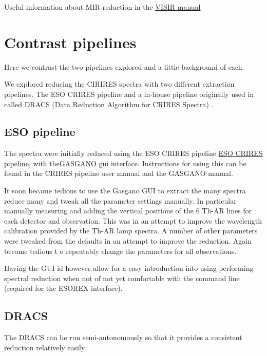 Useful information about MIR reduction in the 
\href{https://www.eso.org/sci/facilities/paranal/instruments/visir/doc/VLT-MAN-ESO-14300-3514_2018-02-01.pdf}{VISIR manual}


\section{Contrast pipelines}

Here we contrast the two pipelines explored and a little background of each.

We explored reducing the CIRIRES spectra with two different extraction pipelines. The ESO CRIRES pipeline and a in-house pipeline originally used in \citet{figueira_radial_2010} called DRACS (Data Reduction Algorithm for CRIRES Spectra) .


\subsection{ESO pipeline}

The spectra were initially reduced using the ESO CRIRES pipeline \href{ESO CRIRES pipeline}{ESO CRIRES pipeline}, with the\href{https://www.eso.org/sci/software/gasgano.html}{GASGANO} gui interface.  Instructions for using this can be found in the CRIRES pipeline user manual and the GASGANO manual.


It soon became tedious to use the Gasgano GUI to extract the many spectra reduce many and tweak all the parameter settings manually. In particular manually measuring and adding the vertical positions of the 6 Th-AR lines for each detector and observation. This was in an attempt to improve the wavelength calibration provided by the Th-AR lamp spectra.
A number of other parameters were tweaked from the defaults in an attempt to  improve the reduction. Again become tedious t o repeatably change the parameters for all observations.

Having the GUI id however allow for a easy introduction into using performing spectral reduction when not of not yet comfortable with the command line (required for the ESOREX interface).

\subsection{DRACS}

The DRACS can be run semi-autonomously so that it provides a consistent reduction relatively easily.


